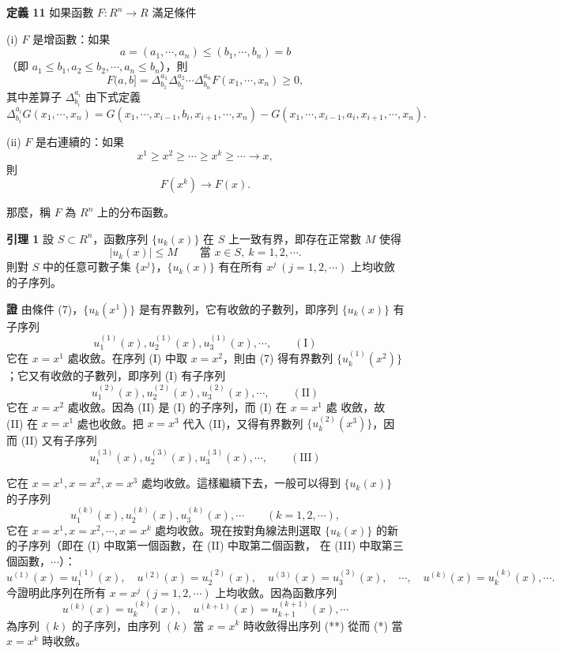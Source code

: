 \documentclass[11pt,a4paper,twoside]{article}
\begin{document}
\noindent\textbf{定義 11}\quad
如果函數 $F:R^n\to R$ 滿足條件

\noindent
(i) $F$ 是增函數：如果
\[
    a=(a_1,\cdots,a_n)\le (b_1,\cdots,b_n)=b
\]
（即 $a_1\le b_1,a_2\le b_2,\cdots,a_n\le b_n$），則
\[
    F(a,b]
    =
    \Delta_{b_1}^{a_1}\Delta_{b_2}^{a_2}\cdots\Delta_{b_n}^{a_n}
    F(x_1,\cdots,x_n)\ge0,
\]
其中差算子 $\Delta_{b_i}^{a_i}$ 由下式定義
\[
    \Delta_{b_i}^{a_i}G(x_1,\cdots,x_n)
    =
    G(x_1,\cdots,x_{i-1},b_i,x_{i+1},\cdots,x_n)
    -
    G(x_1,\cdots,x_{i-1},a_i,x_{i+1},\cdots,x_n).
\]

\noindent
(ii) $F$ 是右連續的：如果
\[
    x^1\ge x^2\ge\cdots\ge x^k\ge\cdots\to x,
\]
則
\[
    F(x^k)\to F(x).
\]

那麼，稱 $F$ 為 $R^n$ 上的分布函數。

\noindent\textbf{引理 1}\quad
設 $S\subset R^n$，函數序列 $\{u_k(x)\}$ 在 $S$ 上一致有界，即存在正常數 $M$ 使得
\[
    |u_k(x)|\le M
    \qquad
    \text{當 }x\in S,\ k=1,2,\cdots .
    \tag{7}
\]
則對 $S$ 中的任意可數子集 $\{x^j\}$，$\{u_k(x)\}$ 有在所有
$x^j\ (j=1,2,\cdots)$ 上均收斂的子序列。

\noindent\textbf{證}\quad
由條件 (7)，$\{u_k(x^1)\}$ 是有界數列，它有收斂的子數列，即序列
$\{u_k(x)\}$ 有子序列
\[
    u_1^{(1)}(x),u_2^{(1)}(x),u_3^{(1)}(x),\cdots ,
    \qquad (\mathrm{I})
\]
它在 $x=x^1$ 處收斂。在序列 (I) 中取 $x=x^2$，則由 (7) 得有界數列
$\{u_k^{(1)}(x^2)\}$；它又有收斂的子數列，即序列 (I) 有子序列
\[
    u_1^{(2)}(x),u_2^{(2)}(x),u_3^{(2)}(x),\cdots ,
    \qquad (\mathrm{II})
\]
它在 $x=x^2$ 處收斂。因為 (II) 是 (I) 的子序列，而 (I) 在 $x=x^1$ 處
收斂，故 (II) 在 $x=x^1$ 處也收斂。把 $x=x^3$ 代入 (II)，又得有界數列
$\{u_k^{(2)}(x^3)\}$，因而 (II) 又有子序列
\[
    u_1^{(3)}(x),u_2^{(3)}(x),u_3^{(3)}(x),\cdots ,
    \qquad (\mathrm{III})
\]

\newpage

它在 $x=x^1,x=x^2,x=x^3$ 處均收斂。這樣繼續下去，一般可以得到
$\{u_k(x)\}$ 的子序列
\[
    u_1^{(k)}(x),u_2^{(k)}(x),u_3^{(k)}(x),\cdots
    \qquad (k=1,2,\cdots),
\]
它在 $x=x^1,x=x^2,\cdots,x=x^k$ 處均收斂。現在按對角線法則選取
$\{u_k(x)\}$ 的新的子序列（即在 (I) 中取第一個函數，在 (II) 中取第二個函數，
在 (III) 中取第三個函數，$\cdots$）：
\[
    u^{(1)}(x)=u_1^{(1)}(x),\quad
    u^{(2)}(x)=u_2^{(2)}(x),\quad
    u^{(3)}(x)=u_3^{(3)}(x),\quad
    \cdots,\quad
    u^{(k)}(x)=u_k^{(k)}(x),\cdots .
    \tag{*}
\]
今證明此序列在所有 $x=x^j\ (j=1,2,\cdots)$ 上均收斂。因為函數序列
\[
    u^{(k)}(x)=u_k^{(k)}(x),\quad
    u^{(k+1)}(x)=u_{k+1}^{(k+1)}(x),\cdots
    \tag{**}
\]
為序列 $(k)$ 的子序列，由序列 $(k)$ 當 $x=x^k$ 時收斂得出序列 (**)
從而 (*) 當 $x=x^k$ 時收斂。
\end{document}

